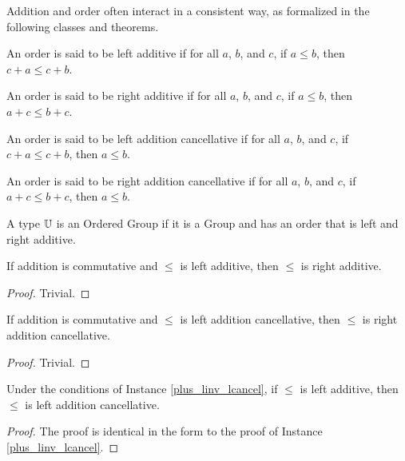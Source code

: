 \documentclass[../math.tex]{subfiles}
\begin{document}
Addition and order often interact in a consistent way, as formalized in the
following classes and theorems.

\begin{class}
    An order is said to be left additive if for all $a$, $b$, and $c$, if $a
    \leq b$, then $c + a \leq c + b$.
\end{class}

\begin{class}
    An order is said to be right additive if for all $a$, $b$, and $c$, if $a
    \leq b$, then $a + c \leq b + c$.
\end{class}

\begin{class}
    An order is said to be left addition cancellative if for all $a$, $b$, and
    $c$, if $c + a \leq c + b$, then $a \leq b$.
\end{class}

\begin{class}
    An order is said to be right addition cancellative if for all $a$, $b$, and
    $c$, if $a + c \leq b + c$, then $a \leq b$.
\end{class}

\begin{class}
    A type $\mathbb{U}$ is an Ordered Group if it is a Group and has an order that is
    left and right additive.
\end{class}

\begin{instance}
    If addition is commutative and $\leq$ is left additive, then $\leq$ is right
    additive.
\end{instance}
\begin{proof}
    Trivial.
\end{proof}

\begin{instance}
    If addition is commutative and $\leq$ is left addition cancellative, then
    $\leq$ is right addition cancellative.
\end{instance}
\begin{proof}
    Trivial.
\end{proof}

\begin{instance}
    Under the conditions of Instance \ref{plus_linv_lcancel}, if $\leq$ is left
    additive, then $\leq$ is left addition cancellative.
\end{instance}
\begin{proof}
    The proof is identical in the form to the proof of Instance
    \ref{plus_linv_lcancel}.
\end{proof}
\end{document}
